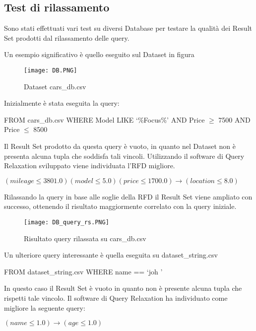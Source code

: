 \subsection{Test di rilassamento}
Sono stati effettuati vari test su diversi Database per testare la qualità dei Result Set prodotti dal rilassamento delle query.

Un esempio significativo è quello eseguito sul Dataset in figura
\begin{figure}[H]
    \centering
    \texttt{[image: DB.PNG]}
    \caption{Dataset cars{\_}db.csv}
    \label{fig:dataset_cars_db}
\end{figure}

Inizialmente è stata eseguita la query:
\begin{center}
FROM cars{\_}db.csv WHERE Model LIKE \lq\%Focus\%\rq
AND Price $\geq$ 7500 AND Price $\leq$ 8500
\end{center}

Il Result Set prodotto da questa query è vuoto, in quanto nel Dataset non è presenta alcuna tupla che soddisfa tali vincoli.
Utilizzando il software di Query Relaxation sviluppato viene individuata l'RFD migliore.
\begin{center}
$(mileage \leq 3801.0) (model \leq 5.0) (price \leq 1700.0) \rightarrow (location \leq 8.0)$
\end{center}

Rilassando la query in base alle soglie della RFD il Result Set viene ampliato con successo, ottenendo il risultato maggiormente correlato con la query iniziale.
\begin{figure}[H]
    \centering
    \texttt{[image: DB\_query\_rs.PNG]}
    \caption{Risultato query rilassata su cars{\_}db.csv}
    \label{fig:rs_query_rx_cars_db}
\end{figure}


Un ulteriore query interessante è quella eseguita su dataset{\_}string.csv
\begin{center}
FROM dataset{\_}string.csv WHERE name == \lq joh \rq
\end{center}

In questo caso il Result Set è vuoto in quanto non è presente alcuna tupla che rispetti tale vincolo.
Il software di Query Relaxation ha individuato come migliore la seguente query:
\begin{center}
    $(name \leq 1.0) \rightarrow (age \leq 1.0)$
\end{center}


